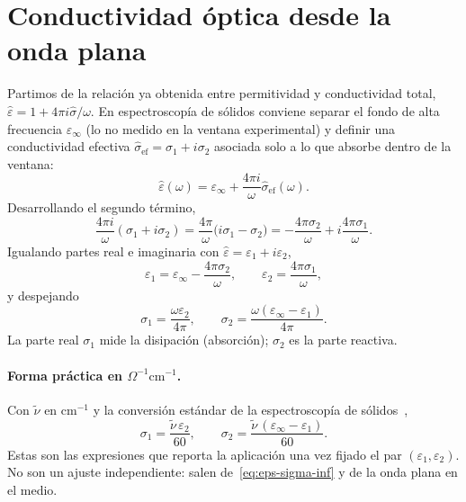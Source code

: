 \section{Conductividad \'optica desde la onda plana}

Partimos de la relaci\'on ya obtenida entre permitividad y conductividad total,
$\hat\varepsilon=1+4\pi i\hat\sigma/\omega$.
En espectroscop\'ia de s\'olidos conviene separar el fondo de alta frecuencia $\varepsilon_\infty$
(lo no medido en la ventana experimental) y definir una conductividad efectiva
$\hat\sigma_{\mathrm{ef}}=\sigma_1+i\sigma_2$ asociada solo a lo que absorbe dentro de la ventana:
\begin{equation}
\label{eq:eps-sigma-inf}
\hat\varepsilon(\omega)=\varepsilon_\infty+\frac{4\pi i}{\omega}\hat\sigma_{\mathrm{ef}}(\omega).
\end{equation}
Desarrollando el segundo t\'ermino,
\begin{equation}
\frac{4\pi i}{\omega}(\sigma_1+i\sigma_2)
=\frac{4\pi}{\omega}\bigl(i\sigma_1-\sigma_2\bigr)
=-\frac{4\pi\sigma_2}{\omega}+i\frac{4\pi\sigma_1}{\omega}.
\end{equation}
Igualando partes real e imaginaria con $\hat\varepsilon=\varepsilon_1+i\varepsilon_2$,
\begin{equation}
\varepsilon_1=\varepsilon_\infty-\frac{4\pi\sigma_2}{\omega},\qquad
\varepsilon_2=\frac{4\pi\sigma_1}{\omega},
\end{equation}
y despejando
\begin{equation}
\label{eq:sigma-gauss}
\sigma_1=\frac{\omega\varepsilon_2}{4\pi},\qquad
\sigma_2=\frac{\omega(\varepsilon_\infty-\varepsilon_1)}{4\pi}.
\end{equation}
La parte real $\sigma_1$ mide la disipaci\'on (absorci\'on); $\sigma_2$ es la parte reactiva.

\paragraph{Forma pr\'actica en \texorpdfstring{$\Omega^{-1}\mathrm{cm}^{-1}$}{Ohm-1 cm-1}.}
Con $\tilde\nu$ en cm$^{-1}$ y la conversi\'on est\'andar de la espectroscop\'ia de s\'olidos~\cite{electrodynamics},
\begin{equation}
\label{eq:sigma}
\sigma_1=\frac{\tilde\nu\,\varepsilon_2}{60},\qquad
\sigma_2=\frac{\tilde\nu\,(\varepsilon_\infty-\varepsilon_1)}{60}.
\end{equation}
Estas son las expresiones que reporta la aplicaci\'on una vez fijado el par $(\varepsilon_1,\varepsilon_2)$.
No son un ajuste independiente: salen de~\eqref{eq:eps-sigma-inf} y de la onda plana en el medio.

